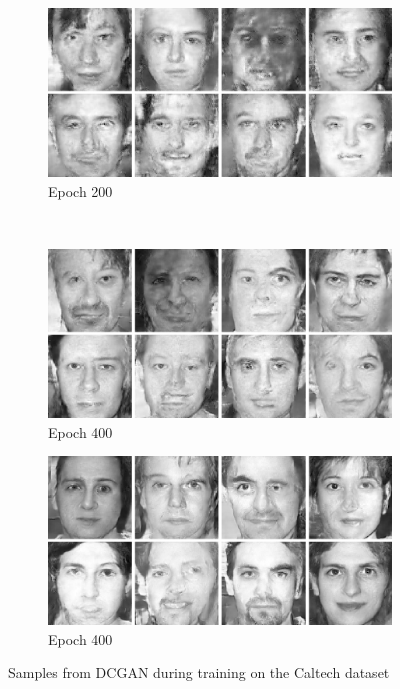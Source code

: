 \begin{figure}
    \begin{subfigure}[b]{0.45\textwidth}
        \includegraphics[width=\textwidth]{fig/dcgan/caltech/epoch2000}
        \caption{Epoch 200}
    \end{subfigure}
    ~
    \begin{subfigure}[b]{0.45\textwidth}
        \includegraphics[width=\textwidth]{fig/dcgan/caltech/epoch4000}
        \caption{Epoch 400}
    \end{subfigure}

    \begin{subfigure}[b]{\textwidth}
        \includegraphics[width=\textwidth]{fig/dcgan/caltech/epoch10000}
        \caption{Epoch 400}
    \end{subfigure}
    \caption{Samples from DCGAN during training on the Caltech dataset}
    \label{dcgan-caltech-samples}
\end{figure}

